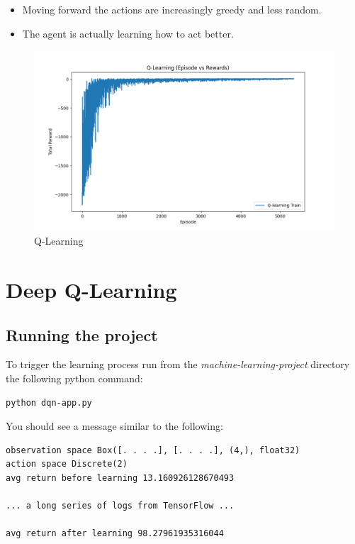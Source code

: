 \documentclass{article}
\begin{document}
\begin{itemize}
  \item Moving forward the actions are increasingly greedy and less random.
  \item The agent is actually learning how to act better.
\end{itemize}

\begin{figure}
  \includegraphics[width=\linewidth]{qlearning.png}
  \caption{Q-Learning}
  \label{fig:qlearning}
\end{figure}

\section{Deep Q-Learning}

\subsection{Running the project}

To trigger the learning process run from the \emph{machine-learning-project} directory the following python command:

\begin{verbatim}
python dqn-app.py
\end{verbatim}

You should see a message similar to the following:

\begin{verbatim}
observation space Box([. . . .], [. . . .], (4,), float32)
action space Discrete(2)  
avg return before learning 13.160926128670493

... a long series of logs from TensorFlow ...

avg return after learning 98.27961935316044
\end{verbatim}
\end{document}
